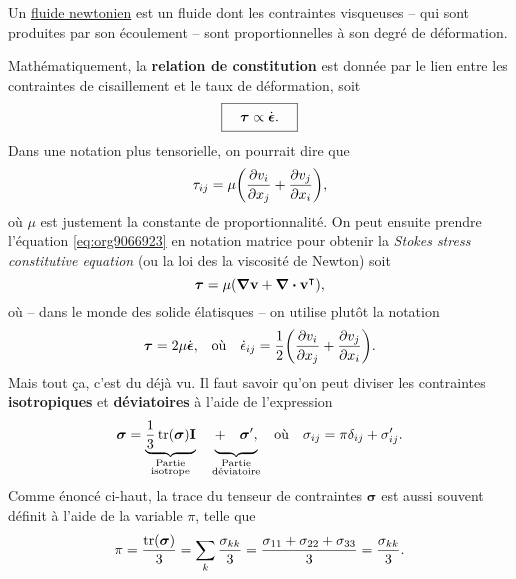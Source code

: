 \documentclass[10pt]{article}
\numberwithin{equation}{section}
\newcommand{\vv}{\vb{v}}
\newcommand{\tall}{\vphantom{pA^{x^x}_p}}
\newcommand{\grande}{\vphantom{\frac{1}{xx}}}
\begin{document}
Un \href{https://en.wikipedia.org/wiki/Newtonian\_fluid}{fluide newtonien} est un fluide dont les contraintes visqueuses -- qui sont produites par son écoulement -- sont proportionnelles à son degré de déformation.\bigskip

Mathématiquement, la \textbf{relation de constitution} est donnée par le lien entre les contraintes de cisaillement et le taux de déformation, soit
\begin{equation}
   \boxed{\tall\quad\boldsymbol{\tau} \propto \dot{\boldsymbol{\epsilon}}.\quad}
\end{equation}
Dans une notation plus tensorielle, on pourrait dire que
\begin{equation}
\label{eq:org9066923}
   \tau_{ij} = \mu \qty(\pdv{v_i}{x_j} + \pdv{v_j}{x_i}),
\end{equation}
où \(\mu\) est justement la constante de proportionnalité.
On peut ensuite prendre l'équation \ref{eq:org9066923} en notation matrice pour obtenir la \emph{Stokes stress constitutive equation} (ou la loi des la viscosité de Newton) soit
\begin{equation}
   \boldsymbol{\tau} = \mu \qty(\gradient{\vv} + \divergence{\vv}^\intercal),
\end{equation}
où -- dans le monde des solide élatisques -- on utilise plutôt la notation
\begin{align}
   &&\boldsymbol{\tau} = 2\mu \dot{\boldsymbol{\epsilon}},
   && \text{où}
   && \dot{\epsilon}_{ij} = \frac{1}{2}\qty(\pdv{v_i}{x_j} + \pdv{v_j}{x_i}).&&
\end{align}
Mais tout ça, c'est du déjà vu.
Il faut savoir qu'on peut diviser les contraintes \textbf{isotropiques} et \textbf{déviatoires} à l'aide de l'expression
\begin{align}
\label{eq:org6dd7d94}
   &&\boldsymbol{\sigma} = \underbrace{\frac{1}{3} \trace(\boldsymbol{\sigma})\mathbf{I}}_{\substack{\text{Partie}\\\text{isotrope}}} \quad \underbrace{+\quad\grande\boldsymbol{\sigma}',}_{\substack{\text{Partie}\\ \text{déviatoire}}}
   && \text{où}
   &&\sigma_{ij} = \pi\delta_{ij} + \sigma_{ij}'.&&
\end{align}
Comme énoncé ci-haut, la trace du tenseur de contraintes \(\boldsymbol{\sigma}\) est aussi souvent définit à l'aide de la variable \(\pi\), telle que
\begin{equation}
   \pi = \frac{\trace(\boldsymbol{\sigma})}{3} = \sum_k \frac{\sigma_{kk}}{3} = \frac{\sigma_{11} + \sigma_{22} +\sigma_{33}}{3} = \frac{\sigma_{kk}}{3}.
\end{equation}
\end{document}
